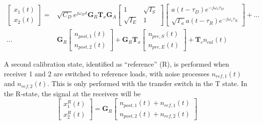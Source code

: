 \documentclass[draftcls,onecolumn]{IEEEtran}  %
\begin{document}
   \begin{equation}
   \begin{split}
      \left[ \begin{array}{c} x_1(t) \\ x_2(t) \end{array} \right]  = &  \sqrt{C_D}e^{j \omega_{IF} t} \mathbf{G}_R \mathbf{T}_x \mathbf{G}_A
          \left[  \begin{array}{cc} 1  & \sqrt{I_S} \\ \sqrt{I_E} & 1  \end{array} \right]
           \left[ \begin{array}{c} a(t-\tau_D) e^{-j \omega_c \tau_D} \\ \sqrt{\Gamma_a} a(t-\tau_R) e^{-j \omega_c \tau_R} \end{array} \right] + ...\\
           ... & \mathbf{G}_R
           \left[ \begin{array}{c} n_{post,1}(t) \\ n_{post,2}(t) \end{array} \right]  + 
                      \mathbf{G}_R \mathbf{T}_x
           \left[ \begin{array}{c} n_{pre,S}(t) \\ n_{pre,E}(t) \end{array} \right]  
           + \mathbf{T}_c n_{cal}(t)
\end{split}
   \label{Eq: x2_model}
\end{equation}

A second calibration state, identified as  ``reference'' (R),  is performed when receiver 1 and 2 are switched to reference loads, with noise processes $n_{ref,1}(t)$ and $n_{ref,2}(t)$. 
This is only performed with the transfer switch in the T state. 
In the R-state, the signal at the receivers will be  
  \begin{equation}
      \left[ \begin{array}{c} x^{R}_1(t) \\ x^{R}_2(t) \end{array} \right]  =  
           \mathbf{G}_R
           \left[ \begin{array}{c} n_{post,1}(t) + n_{ref,1}(t)  \\ n_{post,2}(t)  + n_{ref,2}(t) \end{array} \right]  
           \label{Eq:x2_ref_state}
\end{equation}
\end{document}
